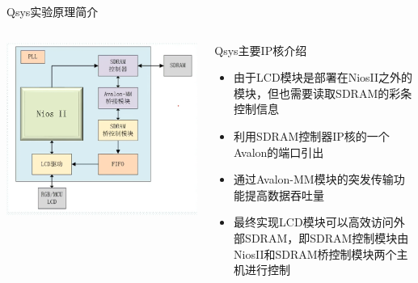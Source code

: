 \documentclass{beamer}
\begin{document}
\begin{frame}{Qsys实验原理简介}
    \begin{columns}
        \begin{column}{0.5\textwidth}
            \centering
            \includegraphics[width=1\textwidth]{pic/001.png}
            \label{fig:system_block_diagram}
        \end{column}
        
        \begin{column}{0.5\textwidth}{Qsys主要IP核介绍}
			\begin{itemize}[<+-| alert@+>]
				\item 由于LCD模块是部署在NiosII之外的模块，但也需要读取SDRAM的彩条控制信息
				\item 利用SDRAM控制器IP核的一个Avalon的端口引出
				\item 通过Avalon-MM模块的突发传输功能提高数据吞吐量
				\item 最终实现LCD模块可以高效访问外部SDRAM，即SDRAM控制模块由NiosII和SDRAM桥控制模块两个主机进行控制
			\end{itemize}
        \end{column}
    \end{columns}
\end{frame}
\end{document}
